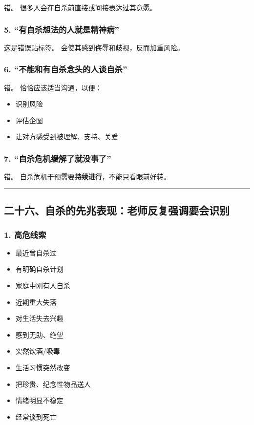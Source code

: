 \documentclass[
  chinese,
  9pt,
  a4paper,
]{ctexart}
\providecommand{\tightlist}{%
  \setlength{\itemsep}{0pt}\setlength{\parskip}{0pt}}
\begin{document}
错。 很多人会在自杀前直接或间接表达过其意愿。

\subsubsection{5.
``有自杀想法的人就是精神病''}\label{ux6709ux81eaux6740ux60f3ux6cd5ux7684ux4ebaux5c31ux662fux7cbeux795eux75c5}

这是错误贴标签。 会使其感到侮辱和歧视，反而加重风险。

\subsubsection{6.
``不能和有自杀念头的人谈自杀''}\label{ux4e0dux80fdux548cux6709ux81eaux6740ux5ff5ux5934ux7684ux4ebaux8c08ux81eaux6740}

错。 恰恰应该适当沟通，以便：

\begin{itemize}
\tightlist
\item
  识别风险
\item
  评估企图
\item
  让对方感受到被理解、支持、关爱
\end{itemize}

\subsubsection{7.
``自杀危机缓解了就没事了''}\label{ux81eaux6740ux5371ux673aux7f13ux89e3ux4e86ux5c31ux6ca1ux4e8bux4e86}

错。 自杀危机干预需要\textbf{持续进行}，不能只看眼前好转。

\begin{center}\rule{0.5\linewidth}{0.5pt}\end{center}

\subsection{二十六、自杀的先兆表现：老师反复强调要会识别}\label{ux4e8cux5341ux516dux81eaux6740ux7684ux5148ux5146ux8868ux73b0ux8001ux5e08ux53cdux590dux5f3aux8c03ux8981ux4f1aux8bc6ux522b}

\subsubsection{1. 高危线索}\label{ux9ad8ux5371ux7ebfux7d22}

\begin{itemize}
\tightlist
\item
  最近曾自杀过
\item
  有明确自杀计划
\item
  家庭中刚有人自杀
\item
  近期重大失落
\item
  对生活失去兴趣
\item
  感到无助、绝望
\item
  突然饮酒/吸毒
\item
  生活习惯突然改变
\item
  把珍贵、纪念性物品送人
\item
  情绪明显不稳定
\item
  经常谈到死亡
\end{itemize}
\end{document}
